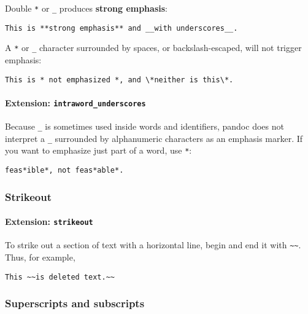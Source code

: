 \documentclass[
  a4paper,
]{article}
\begin{document}
Double \texttt{*} or \texttt{\_} produces \textbf{strong emphasis}:

\begin{verbatim}
This is **strong emphasis** and __with underscores__.
\end{verbatim}

A \texttt{*} or \texttt{\_} character surrounded by spaces, or
backslash-escaped, will not trigger emphasis:

\begin{verbatim}
This is * not emphasized *, and \*neither is this\*.
\end{verbatim}

\hypertarget{extension-intraword_underscores}{%
\paragraph{\texorpdfstring{Extension:
\texttt{intraword\_underscores}}{Extension: intraword\_underscores}}\label{extension-intraword_underscores}}

Because \texttt{\_} is sometimes used inside words and identifiers,
pandoc does not interpret a \texttt{\_} surrounded by alphanumeric
characters as an emphasis marker. If you want to emphasize just part of
a word, use \texttt{*}:

\begin{verbatim}
feas*ible*, not feas*able*.
\end{verbatim}

\hypertarget{strikeout}{%
\subsubsection{Strikeout}\label{strikeout}}

\hypertarget{extension-strikeout}{%
\paragraph{\texorpdfstring{Extension:
\texttt{strikeout}}{Extension: strikeout}}\label{extension-strikeout}}

To strike out a section of text with a horizontal line, begin and end it
with \texttt{\textasciitilde{}\textasciitilde{}}. Thus, for example,

\begin{verbatim}
This ~~is deleted text.~~
\end{verbatim}

\hypertarget{superscripts-and-subscripts}{%
\subsubsection{Superscripts and
subscripts}\label{superscripts-and-subscripts}}
\end{document}
